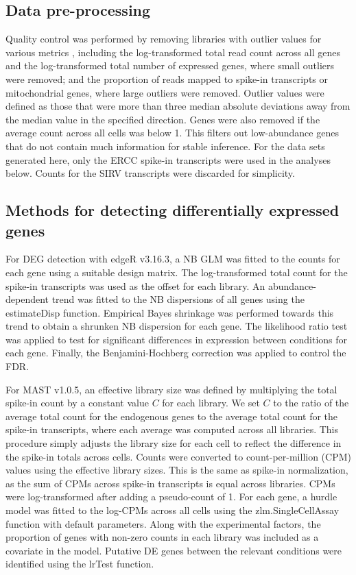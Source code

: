 \documentclass{article}
\begin{document}
\subsection{Data pre-processing}
Quality control was performed by removing libraries with outlier values for various metrics \cite{lun2016stepbystep}, including 
the log-transformed total read count across all genes and the log-transformed total number of expressed genes, where small outliers were removed; 
and the proportion of reads mapped to spike-in transcripts or mitochondrial genes, where large outliers were removed.
Outlier values were defined as those that were more than three median absolute deviations away from the median value in the specified direction.
Genes were also removed if the average count across all cells was below 1.
This filters out low-abundance genes that do not contain much information for stable inference.
For the data sets generated here, only the ERCC spike-in transcripts were used in the analyses below.
Counts for the SIRV transcripts were discarded for simplicity.

\subsection{Methods for detecting differentially expressed genes}
For DEG detection with edgeR v3.16.3, a NB GLM was fitted to the counts for each gene \cite{mccarthy2012differential} using a suitable design matrix.
The log-transformed total count for the spike-in transcripts was used as the offset for each library.
An abundance-dependent trend was fitted to the NB dispersions of all genes using the estimateDisp function.
Empirical Bayes shrinkage was performed towards this trend to obtain a shrunken NB dispersion for each gene.
The likelihood ratio test was applied to test for significant differences in expression between conditions for each gene. 
Finally, the Benjamini-Hochberg correction was applied to control the FDR.

For MAST v1.0.5, an effective library size was defined by multiplying the total spike-in count by a constant value $C$ for each library.
We set $C$ to the ratio of the average total count for the endogenous genes to the average total count for the spike-in transcripts, where each average was computed across all libraries.
This procedure simply adjusts the library size for each cell to reflect the difference in the spike-in totals across cells.
Counts were converted to count-per-million (CPM) values using the effective library sizes.
This is the same as spike-in normalization, as the sum of CPMs across spike-in transcripts is equal across libraries.
CPMs were log-transformed after adding a pseudo-count of 1.
For each gene, a hurdle model was fitted to the log-CPMs across all cells using the zlm.SingleCellAssay function with default parameters.
Along with the experimental factors, the proportion of genes with non-zero counts in each library was included as a covariate \cite{finak2015mast} in the model.
Putative DE genes between the relevant conditions were identified using the lrTest function.
\end{document}
